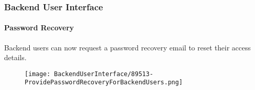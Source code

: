 
\begin{frame}[fragile]
	\frametitle{Backend User Interface}
	\framesubtitle{Password Recovery}

	Backend users can now request a password recovery email to reset their access details.

	\begin{figure}
		\texttt{[image: BackendUserInterface/89513-ProvidePasswordRecoveryForBackendUsers.png]}
	\end{figure}

\end{frame}

